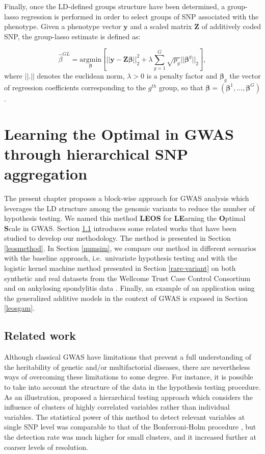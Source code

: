 \documentclass[]{book}
\begin{document}
Finally, once the LD-defined groups structure have been determined, a
group-lasso regression is performed in order to select groups of SNP
associated with the phenotype. Given a phenotype vector \(\mathbf{y}\) and a
scaled matrix \(\mathbf{Z}\) of additively coded SNP, the group-lasso estimate is
defined as:

\[\hat{\beta}^{GL} = \underset{\boldsymbol{\beta}}{\text{argmin}} \left[ ||\mathbf{y} - \mathbf{Z}\boldsymbol{\beta}||^2_2 + \lambda \sum_{g=1}^G \sqrt{p_g}||\boldsymbol{\beta}^g||_2  \right],\]
where \(||.||\) denotes the euclidean norm, \(\lambda > 0\) is a penalty
factor and \(\boldsymbol{\beta}_g\) the vector of regression coefficients
corresponding to the \(g^{th}\) group, so that
\(\boldsymbol{\beta} = (\boldsymbol{\beta}^1,\dots,\boldsymbol{\beta}^G)\).

\hypertarget{LEOS}{%
\chapter{Learning the Optimal in GWAS through hierarchical SNP aggregation}\label{LEOS}}

The present chapter proposes a block-wise approach for GWAS analysis which leverages the LD structure among the genomic variants to reduce the number of hypothesis testing. We named this method \textbf{LEOS} for \textbf{LE}arning the \textbf{O}ptimal \textbf{S}cale in GWAS. Section \ref{introleos} introduces some related works that have been studied to develop our methodology. The method is presented in Section \ref{leosmethod}. In Section \ref{numsim}, we compare our method in different scenarios with the baseline approach, i.e.~univariate hypothesis testing \citep{purcell_2007_plink} and with the logistic kernel machine method presented in Section \ref{rare-variant} on both synthetic and real datasets from the Wellcome Trust Case Control Consortium \citep{burton_genome-wide_2007} and on ankylosing spondylitis data \citep{IGAS_2013_identification}. Finally, an example of an application using the generalized additive models in the context of GWAS is exposed in Section \ref{leosgam}.

\hypertarget{introleos}{%
\section{Related work}\label{introleos}}

Although classical GWAS have limitations that prevent a full
understanding of the heritability of genetic and/or multifactorial
diseases, there are nevertheless ways of overcoming these limitations to
some degree. For instance, it is possible to take into account the
structure of the data in the hypothesis testing procedure. As an
illustration, \citep{meinshausen_hierarchical_2008} proposed a hierarchical
testing approach which considers the influence of clusters of highly
correlated variables rather than individual variables. The statistical
power of this method to detect relevant variables at single SNP level
was comparable to that of the Bonferroni-Holm procedure
\citep{Holm_Bonferroni}, but the detection rate was much higher for small
clusters, and it increased further at coarser levels of resolution.
\end{document}
